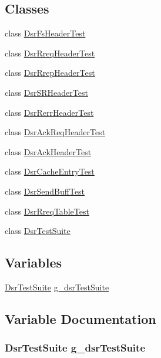 \subsection*{Classes}
\begin{DoxyCompactItemize}
\item 
class \hyperlink{classDsrFsHeaderTest}{Dsr\+Fs\+Header\+Test}
\item 
class \hyperlink{classDsrRreqHeaderTest}{Dsr\+Rreq\+Header\+Test}
\item 
class \hyperlink{classDsrRrepHeaderTest}{Dsr\+Rrep\+Header\+Test}
\item 
class \hyperlink{classDsrSRHeaderTest}{Dsr\+S\+R\+Header\+Test}
\item 
class \hyperlink{classDsrRerrHeaderTest}{Dsr\+Rerr\+Header\+Test}
\item 
class \hyperlink{classDsrAckReqHeaderTest}{Dsr\+Ack\+Req\+Header\+Test}
\item 
class \hyperlink{classDsrAckHeaderTest}{Dsr\+Ack\+Header\+Test}
\item 
class \hyperlink{classDsrCacheEntryTest}{Dsr\+Cache\+Entry\+Test}
\item 
class \hyperlink{classDsrSendBuffTest}{Dsr\+Send\+Buff\+Test}
\item 
class \hyperlink{classDsrRreqTableTest}{Dsr\+Rreq\+Table\+Test}
\item 
class \hyperlink{classDsrTestSuite}{Dsr\+Test\+Suite}
\end{DoxyCompactItemize}
\subsection*{Variables}
\begin{DoxyCompactItemize}
\item 
\hyperlink{classDsrTestSuite}{Dsr\+Test\+Suite} \hyperlink{dsr-test-suite_8cc_a5317988682958c7313c9b5a1826194fe}{g\+\_\+dsr\+Test\+Suite}
\end{DoxyCompactItemize}


\subsection{Variable Documentation}
\subsubsection[{\texorpdfstring{g\+\_\+dsr\+Test\+Suite}{g_dsrTestSuite}}]{\setlength{\rightskip}{0pt plus 5cm} {\bf Dsr\+Test\+Suite}  g\+\_\+dsr\+Test\+Suite}\hypertarget{dsr-test-suite_8cc_a5317988682958c7313c9b5a1826194fe}{}\label{dsr-test-suite_8cc_a5317988682958c7313c9b5a1826194fe}
